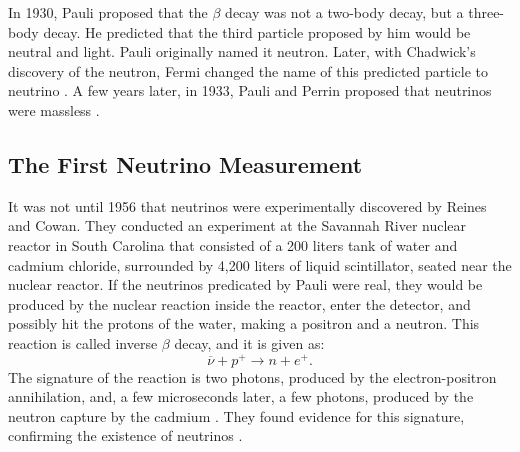 %
In 1930, Pauli proposed that the $\beta$ decay was not a two-body decay, but a three-body decay. He predicted that the third particle proposed by him would be neutral and light. Pauli originally named it neutron. Later, with Chadwick's discovery of the neutron, Fermi changed the name of this predicted particle to neutrino \cite{griffiths}. A few years later, in 1933, Pauli and Perrin proposed that neutrinos were massless \cite{griffiths}.
%
\subsection{The First Neutrino Measurement}
It was not until 1956 that neutrinos were experimentally discovered by Reines and Cowan. They conducted an experiment at the Savannah River nuclear reactor in South Carolina that consisted of a 200 liters tank of water and cadmium chloride, surrounded by 4,200 liters of liquid scintillator, seated near the nuclear reactor. If the neutrinos predicated by Pauli were real, they would be produced by the nuclear reaction inside the reactor, enter the detector, and possibly hit the protons of the water, making a positron and a neutron. This reaction is called inverse $\beta$ decay, and it is given as:
%
\begin{equation}
	\overline{\nu} + p^+ \longrightarrow n + e^+.
	\label{inverse_beta_decay_eq}
\end{equation}
%
The signature of the reaction is two photons, produced by the electron-positron annihilation, and, a few microseconds later, a few photons, produced by the neutron capture by the cadmium \cite{nobel_leptons}. They found evidence for this signature, confirming the existence of neutrinos \cite{cowan_reines}. 
%
